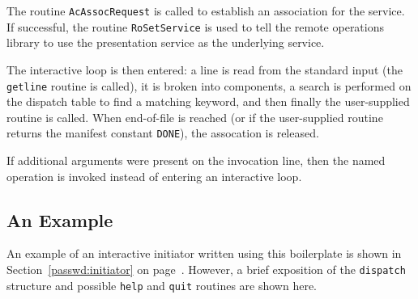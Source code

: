 The routine \verb"AcAssocRequest" is called to establish an association for
the service.
If successful,
the routine \verb"RoSetService" is used to tell the remote operations library
to use the presentation service as the underlying service.

The interactive loop is then entered:
a line is read from the standard input (the \verb"getline" routine is called),
it is broken into components,
a search is performed on the dispatch table to find a matching keyword,
and then finally the user-supplied routine is called.
When end-of-file is reached
(or if the user-supplied routine returns the manifest constant \verb"DONE"),
the assocation is released.

If additional arguments were present on the invocation line,
then the named operation is invoked instead of entering an interactive loop.

\newpage

\subsection	{An Example}
An example of an interactive initiator written using this boilerplate is
shown in Section~\ref{passwd:initiator} on page~\pageref{passwd:initiator}.
However,
a brief exposition of the \verb"dispatch" structure and possible
\verb"help" and \verb"quit" routines are shown here.

